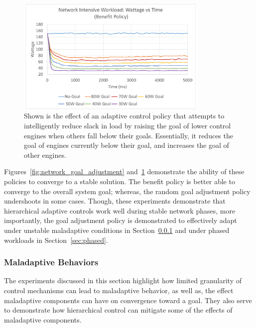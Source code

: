             \begin{figure}[htb!]
                \centering
                \includegraphics[width=0.82\textwidth]{Fig/network_benefit.pdf}
                \caption[Network Intensive Workload Using a Benefit Policy (Watts vs Time)]{Shown is the effect of an adaptive control policy that attempts to intelligently reduce slack in load by raising the goal of lower control engines when others fall below their goals. Essentially, it reduces the goal of engines currently below their goal, and increases the goal of other engines.}
                \label{fig:network_benefit}
            \end{figure}

            Figures~\ref{fig:network_goal_adjustment} and~\ref{fig:network_benefit} demonstrate the ability of these policies to converge to a stable solution. The benefit policy is better able to converge to the overall system goal; whereas, the random goal adjustment policy undershoots in some cases. Though, these experiments demonstrate that hierarchical adaptive controls work well during stable network phases, more importantly, the goal adjustment policy is demonstrated to effectively adapt under unstable maladaptive conditions in Section~\ref{sec:network_maladaptive_behaviors} and under phased workloads in Section~\ref{sec:phased}. 

        \subsubsection{Maladaptive Behaviors}
            \label{sec:network_maladaptive_behaviors}
            The experiments discussed in this section highlight how limited granularity of control mechanisms can lead to maladaptive behavior, as well as, the effect maladaptive components can have on convergence toward a goal. They also serve to demonstrate how hierarchical control can mitigate some of the effects of maladaptive components.

